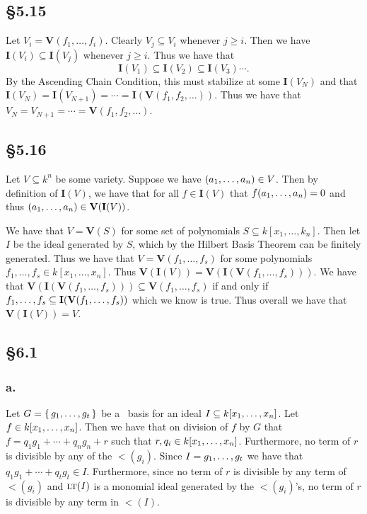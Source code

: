 \documentclass[letterpaper]{article}
\begin{document}
\subsection{\S 5.15}

Let $V_{i} = \textbf{V}(f_{1}, \ldots, f_{i})$. Clearly $V_{j} \subseteq V_{i}$ whenever $j \geq i$. Then we have $\textbf{I}(V_{i}) \subseteq \textbf{I}(V_{j})$ whenever $j \geq i$. Thus we have that
\[
  \textbf{I}(V_{1}) \subseteq \textbf{I}(V_{2}) \subseteq \textbf{I}(V_{3}) \cdots.
\]
By the Ascending Chain Condition, this must stabilize at some $\textbf{I}(V_{N})$ and that $\textbf{I}(V_{N}) = \textbf{I}(V_{N + 1}) = \cdots = \textbf{I}(\textbf{V}(f_{1}, f_{2}, \ldots))$. Thus we have that $V_{N} = V_{N + 1} = \cdots = \textbf{V}(f_{1}, f_{2}, \ldots)$.

\subsection{\S 5.16}

Let $V \subseteq k^{n}$ be some variety. Suppose we have $\pqty{a_{1}, \ldots, a_{n}} \in V$. Then by definition of $\textbf{I}(V)$, we have that for all $f \in \textbf{I}(V)$ that $f\pqty{a_{1}, \ldots, a_{n}} = 0$ and thus $\pqty{a_{1}, \ldots, a_{n}} \in \textbf{V}(\textbf{I}(V))$.

We have that $V = \textbf{V}(S)$ for some set of polynomials $S \subseteq k[x_{1}, \ldots, k_{n}]$. Then let $I$ be the ideal generated by $S$, which by the Hilbert Basis Theorem can be finitely generated. Thus we have that $V = \textbf{V}(f_{1}, \ldots, f_{s})$ for some polynomials $f_{1}, \ldots, f_{s} \in k[x_{1}, \ldots, x_{n}]$. Thus $\textbf{V}(\textbf{I}(V)) = \textbf{V}(\textbf{I}(\textbf{V}(f_{1}, \ldots, f_{s})))$. We have that $\textbf{V}(\textbf{I}(\textbf{V}(f_{1}, \ldots, f_{s}))) \subseteq \textbf{V}(f_{1}, \ldots, f_{s})$ if and only if $\gen{f_{1}, \ldots, f_{s}} \subseteq \textbf{I}(\textbf{V}(f_{1}, \ldots, f_{s}))$ which we know is true. Thus overall we have that $\textbf{V}(\textbf{I}(V)) = V$.

\subsection{\S 6.1}

\subsubsection{a.}

Let $G = \set{g_{1}, \ldots, g_{t}}$ be a \Grobner\ basis for an ideal $I \subseteq k\bqty{x_{1}, \ldots, x_{n}}$. Let $f \in k\bqty{x_{1}, \ldots, x_{n}}$. Then we have that on division of $f$ by $G$ that $f = q_{1}g_{1} + \cdots + q_{n}g_{n} + r$ such that $r, q_{i} \in k\bqty{x_{1}, \ldots, x_{n}}$. Furthermore, no term of $r$ is divisible by any of the $\lt(g_{i})$. Since $I = \gen{g_{1}, \ldots, g_{t}}$ we have that $q_{1}g_{1} + \cdots + q_{t}g_{t} \in I$. Furthermore, since no term of $r$ is divisible by any term of $\lt(g_{i})$ and $\gen{\lt(I)}$ is a monomial ideal generated by the $\lt(g_{i})$'s, no term of $r$ is divisible by any term in $\lt(I)$.
\end{document}
